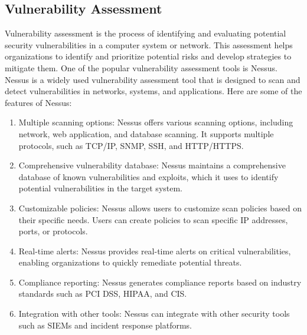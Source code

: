 \documentclass[openany]{book}
\begin{document}
\subsection{Vulnerability Assessment}
Vulnerability assessment is the process of identifying and evaluating potential security vulnerabilities in a computer system or network. This assessment helps organizations to identify and prioritize potential risks and develop strategies to mitigate them. One of the popular vulnerability assessment tools is Nessus.\\

Nessus is a widely used vulnerability assessment tool that is designed to scan and detect vulnerabilities in networks, systems, and applications. Here are some of the features of Nessus:
\begin{enumerate}
    \item Multiple scanning options: Nessus offers various scanning options, including network, web application, and database scanning. It supports multiple protocols, such as TCP/IP, SNMP, SSH, and HTTP/HTTPS.
    \item Comprehensive vulnerability database: Nessus maintains a comprehensive database of known vulnerabilities and exploits, which it uses to identify potential vulnerabilities in the target system.
    \item Customizable policies: Nessus allows users to customize scan policies based on their specific needs. Users can create policies to scan specific IP addresses, ports, or protocols.
    \item Real-time alerts: Nessus provides real-time alerts on critical vulnerabilities, enabling organizations to quickly remediate potential threats.
    \item Compliance reporting: Nessus generates compliance reports based on industry standards such as PCI DSS, HIPAA, and CIS.
    \item Integration with other tools: Nessus can integrate with other security tools such as SIEMs and incident response platforms.

\end{enumerate}
\end{document}

